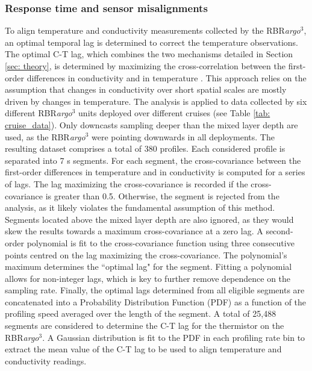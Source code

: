 \documentclass{ametsocV6.1}
\begin{document}
\subsubsection{Response time and sensor misalignments}
To align temperature and conductivity measurements collected by the RBR\textit{argo}$^3$, an optimal temporal lag is determined to correct the temperature observations. The optimal C-T lag, which combines the two mechanisms detailed in Section \ref{sec: theory}, is determined by maximizing the cross-correlation between the first-order differences in conductivity and in temperature \citep{Barth_1996,Ullman_2014,Dever_2020}. This approach relies on the assumption that changes in conductivity over short spatial scales are mostly driven by changes in temperature. The analysis is applied to data collected by six different RBR\textit{argo}$^3$ units deployed over different cruises (see Table \ref{tab: cruise_data}). Only downcasts sampling deeper than the mixed layer depth are used, as the RBR\textit{argo}$^3$ were pointing downwards in all deployments. The resulting dataset comprises a total of 380 profiles.
Each considered profile is separated into 7 s segments. 
For each segment, the cross-covariance between the first-order differences in temperature and in conductivity is computed for a series of lags. 
The lag maximizing the cross-covariance is recorded if the cross-covariance is greater than 0.5. 
Otherwise, the segment is rejected from the analysis, as it likely violates the fundamental assumption of this method. 
Segments located above the mixed layer depth are also ignored, as they would skew the results towards a maximum cross-covariance at a zero lag. 
A second-order polynomial is fit to the cross-covariance function using three consecutive points centred on the lag maximizing the cross-covariance. 
The polynomial's maximum determines the ``optimal lag" for the segment. 
Fitting a polynomial allows for non-integer lags, which is key to further remove dependence on the sampling rate. 
Finally, the optimal lags determined from all eligible segments are concatenated into a Probability Distribution Function (PDF) as a function of the profiling speed averaged over the length of the segment. 
A total of 25,488 segments are considered to determine the C-T lag for the thermistor on the RBR\textit{argo}$^3$. 
A Gaussian distribution is fit to the PDF in each profiling rate bin to extract the mean value of the C-T lag to be used to align temperature and conductivity readings.
\end{document}
